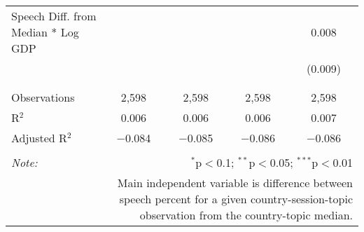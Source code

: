 \begin{table}[!htbp]
\begin{tabular}{@{\extracolsep{5pt}}lcccc}
 Speech Diff. from Median * Log GDP &  &  &  & 0.008 \\ 
  &  &  &  & (0.009) \\ 
  & & & & \\ 
\hline \\[-1.8ex] 
Observations & 2,598 & 2,598 & 2,598 & 2,598 \\ 
R$^{2}$ & 0.006 & 0.006 & 0.006 & 0.007 \\ 
Adjusted R$^{2}$ & $-$0.084 & $-$0.085 & $-$0.086 & $-$0.086 \\ 
\hline 
\hline \\[-1.8ex] 
\textit{Note:}  & \multicolumn{4}{r}{$^{*}$p$<$0.1; $^{**}$p$<$0.05; $^{***}$p$<$0.01} \\ 
 & \multicolumn{4}{r}{Main independent variable is difference between speech percent for a given country-session-topic observation from the country-topic median.} \\ 
\end{tabular} 
\end{table} 
